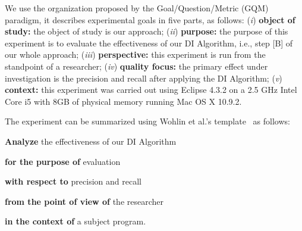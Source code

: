 We use the organization proposed by the Goal/Question/Metric (GQM) paradigm, it describes experimental goals in five parts, as follows:
%
%
%
%
%
%
%
(\textit{i}) \textbf{object of study:} the object of study is our approach; (\textit{ii}) \textbf{purpose:} the purpose of this experiment is to evaluate the effectiveness of our DI Algorithm, i.e., step [B] of our whole approach; (\textit{iii}) \textbf{perspective:} this experiment is run from the standpoint of a researcher; (\textit{iv}) \textbf{quality focus:} the primary effect under investigation is the precision and recall after applying the DI Algorithm; (\textit{v}) \textbf{context:} this experiment was carried out using Eclipse 4.3.2 on a 2.5 GHz Intel Core i5 with 8GB of physical memory running Mac OS X 10.9.2.

The experiment can be summarized using Wohlin et al.'s template~\cite{Wohlin} as follows: 

\textbf{Analyze} the effectiveness of our DI Algorithm

\textbf{for the purpose of} evaluation

\textbf{with respect to} precision and recall

\textbf{from the point of view of} the researcher

\textbf{in the context of} a subject program. 


